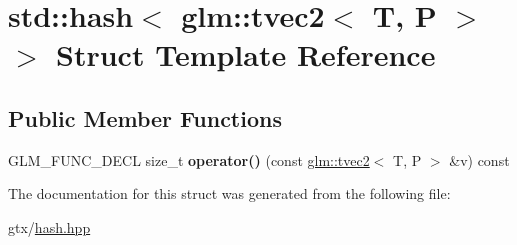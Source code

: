 \hypertarget{structstd_1_1hash_3_01glm_1_1tvec2_3_01T_00_01P_01_4_01_4}{\section{std\-:\-:hash$<$ glm\-:\-:tvec2$<$ T, P $>$ $>$ Struct Template Reference}
\label{structstd_1_1hash_3_01glm_1_1tvec2_3_01T_00_01P_01_4_01_4}
}
\subsection*{Public Member Functions}
\begin{DoxyCompactItemize}
\item 
\hypertarget{structstd_1_1hash_3_01glm_1_1tvec2_3_01T_00_01P_01_4_01_4_ad88a88ffac3dc485aa9f0ec647af0fae}{G\-L\-M\-\_\-\-F\-U\-N\-C\-\_\-\-D\-E\-C\-L size\-\_\-t {\bfseries operator()} (const \hyperlink{structglm_1_1tvec2}{glm\-::tvec2}$<$ T, P $>$ \&v) const }\label{structstd_1_1hash_3_01glm_1_1tvec2_3_01T_00_01P_01_4_01_4_ad88a88ffac3dc485aa9f0ec647af0fae}

\end{DoxyCompactItemize}


The documentation for this struct was generated from the following file\-:\begin{DoxyCompactItemize}
\item 
gtx/\hyperlink{hash_8hpp}{hash.\-hpp}\end{DoxyCompactItemize}

